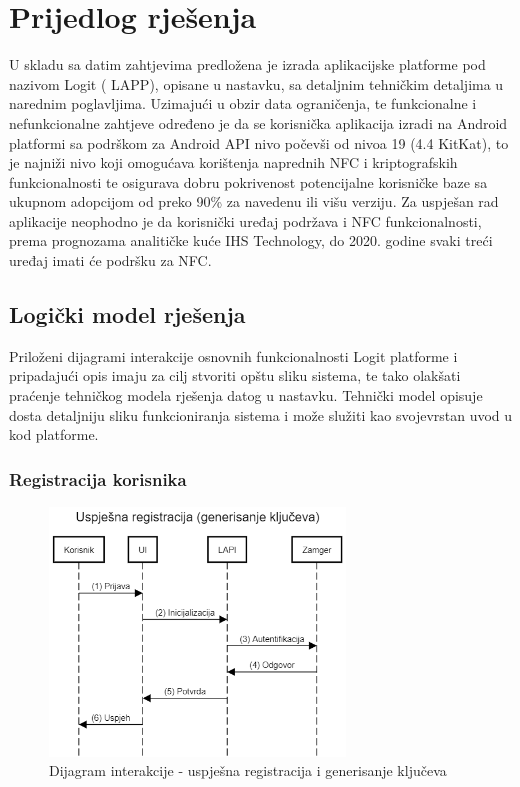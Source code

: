 \chapter{Prijedlog rješenja}
U skladu sa datim zahtjevima predložena je izrada aplikacijske platforme pod nazivom Logit (
\gls{LAPP}), opisane u nastavku, sa detaljnim tehničkim detaljima u narednim poglavljima. Uzimajući u obzir data ograničenja, te funkcionalne i nefunkcionalne zahtjeve određeno je da se korisnička aplikacija izradi na Android platformi sa podrškom za Android API nivo počevši od nivoa 19 (4.4 KitKat), to je najniži nivo koji omogućava korištenja naprednih NFC i kriptografskih funkcionalnosti te osigurava dobru pokrivenost potencijalne korisničke baze sa ukupnom adopcijom od preko 90\% za navedenu ili višu verziju\cite{droidstats}. Za uspješan rad aplikacije neophodno je da korisnički uređaj podržava i NFC funkcionalnosti, prema prognozama analitičke kuće IHS Technology, do 2020. godine svaki treći uređaj imati će podršku za NFC.\cite{nfcforecast}

\section{Logički model rješenja}
Priloženi dijagrami interakcije osnovnih funkcionalnosti Logit platforme i pripadajući opis imaju za cilj stvoriti opštu sliku sistema, te tako olakšati praćenje tehničkog modela rješenja datog u nastavku. Tehnički model opisuje dosta detaljniju sliku funkcioniranja sistema i može služiti kao svojevrstan uvod u kod platforme.

\subsection*{Registracija korisnika}
\begin{figure}[H]
    \centering
    \includegraphics[width=0.7\textwidth]{material/dia/01_registracija}
    \caption{Dijagram interakcije - uspješna registracija i generisanje ključeva}
\end{figure}
